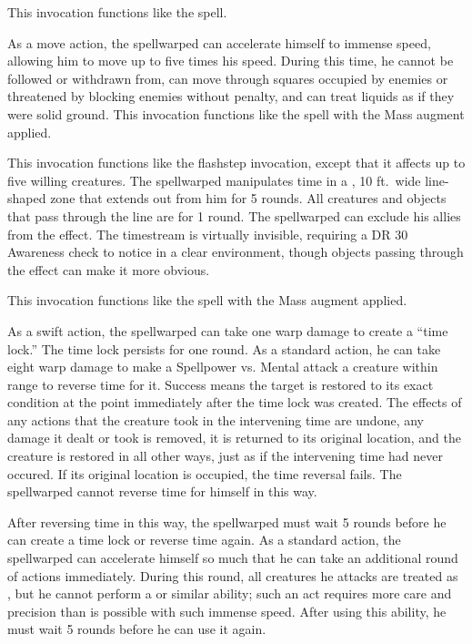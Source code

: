             This invocation functions like the  spell.

            As a move action, the spellwarped can accelerate himself to immense speed, allowing him to move up to five times his speed.
            During this time, he cannot be followed or withdrawn from, can move through squares occupied by enemies or threatened by blocking enemies without penalty, and can treat liquids as if they were solid ground.
            This invocation functions like the  spell with the Mass augment applied.

            This invocation functions like the flashstep invocation, except that it affects up to five willing creatures.
            The spellwarped manipulates time in a \arealarge, 10 ft.\ wide line-shaped zone that extends out from him for 5 rounds.
            All creatures and objects that pass through the line are \slowed for 1 round.
            The spellwarped can exclude his allies from the effect.
            The timestream is virtually invisible, requiring a DR 30 Awareness check to notice in a clear environment, though objects passing through the effect can make it more obvious.

            This invocation functions like the  spell with the Mass augment applied.

            As a swift action, the spellwarped can take one warp damage to create a ``time lock.'' The time lock persists for one round.
            As a standard action, he can take eight warp damage to make a Spellpower vs. Mental attack a creature within \rngmed range to reverse time for it.
            Success means the target is restored to its exact condition at the point immediately after the time lock was created.
            The effects of any actions that the creature took in the intervening time are undone, any damage it dealt or took is removed, it is returned to its original location, and the creature is restored in all other ways, just as if the intervening time had never occured.
            If its original location is occupied, the time reversal fails.
            The spellwarped cannot reverse time for himself in this way.
            \par After reversing time in this way, the spellwarped must wait 5 rounds before he can create a time lock or reverse time again.
            As a standard action, the spellwarped can accelerate himself so much that he can take an additional round of actions immediately.
            During this round, all creatures he attacks are treated as \helpless, but he cannot perform a  or similar ability; such an act requires more care and precision than is possible with such immense speed.
            After using this ability, he must wait 5 rounds before he can use it again.

